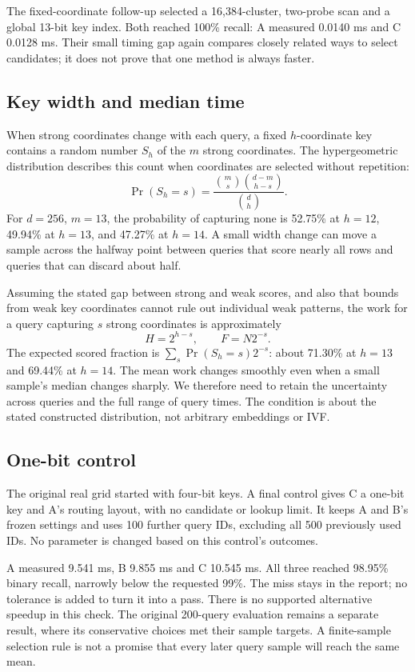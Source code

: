 The fixed-coordinate follow-up selected a 16,384-cluster, two-probe scan and a global 13-bit
key index. Both reached 100\% recall: A measured 0.0140 ms and C 0.0128 ms. Their small timing gap again compares closely related ways to select candidates; it does
not prove that one method is always faster.

\subsection{Key width and median time}
When strong coordinates change with each query, a fixed $h$-coordinate key contains a random
number $S_h$ of the $m$ strong coordinates. The hypergeometric distribution describes this
count when coordinates are selected without repetition:
\begin{equation}
\Pr(S_h=s)=\frac{\binom ms\binom{d-m}{h-s}}{\binom dh}.
\label{eq:captured-strong}
\end{equation}
For $d=256$, $m=13$, the probability of capturing none is 52.75\% at $h=12$, 49.94\% at $h=13$,
and 47.27\% at $h=14$. A small width change can move a sample across the halfway point between
queries that score nearly all rows and queries that can discard about half.

Assuming the stated gap between strong and weak scores, and also that bounds from weak key
coordinates cannot rule out individual weak patterns, the work for a query capturing $s$ strong coordinates is approximately
\[
H=2^{h-s},\qquad F=N2^{-s}.
\]
The expected scored fraction is $\sum_s\Pr(S_h=s)2^{-s}$: about 71.30\% at $h=13$ and 69.44\%
at $h=14$. The mean work changes smoothly even when a small sample's median changes sharply.
We therefore need to retain the uncertainty across queries and the full range of query times.
The condition is about the stated constructed distribution, not arbitrary embeddings or IVF.

\subsection{One-bit control}
The original real grid started with four-bit keys. A final control gives C a one-bit key and
A's routing layout, with no candidate or lookup limit. It keeps A and B's frozen settings and
uses 100 further query IDs, excluding all 500 previously used IDs. No parameter is changed
based on this control's outcomes.

A measured 9.541 ms, B 9.855 ms and C 10.545 ms. All three reached 98.95\% binary recall,
narrowly below the requested 99\%. The miss stays in the report; no tolerance is added to turn
it into a pass. There is no supported alternative speedup in this check. The original 200-query
evaluation remains a separate result, where its conservative choices met their sample targets.
A finite-sample selection rule is not a promise that every later query sample will reach the same mean.

